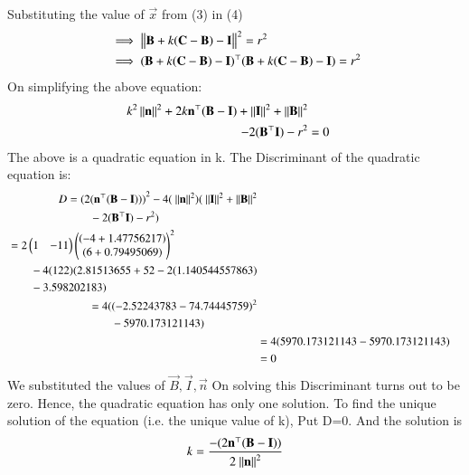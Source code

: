 \documentclass[journal,12pt,twocolumn]{IEEEtran}
\theoremstyle{remark}
\begin{document}
Substituting the value of $ \vec{x} $ from (3) in (4)
\begin{align}
  &\implies\left\lVert \mathbf{B} + k(\mathbf{C}-\mathbf{B})- \mathbf{I} \right\rVert^2 = r^2 \\
  &\implies(\mathbf{B} + k(\mathbf{C}-\mathbf{B})- \mathbf{I})^{\top} (\mathbf{B} + k(\mathbf{C}-\mathbf{B})- \mathbf{I}) = r^2 
\end{align}
On simplifying the above equation:
\begin{align}
\begin{split}
k^2\left\lVert\mathbf{n}\right\rVert^2 +2k{\mathbf{n}^{\top}}({\mathbf{B}-\mathbf{I}})+\left\lVert\mathbf{I}\right\rVert^2 +\left\lVert\mathbf{B}\right\rVert^2\\-2(\mathbf{B}^{\top}\mathbf{I}) - r^2&=0
\end{split}
\end{align}
The above is a quadratic equation in k.
The Discriminant of the quadratic equation is:
\begin{align}
\begin{split}
D &= {(2(\vec{n}^{\top}({\vec{B}-\vec{I}})))}^2-4(\ \norm{\vec{n}}^2)(\ \norm{\vec{I}}^2 +\norm{\vec{B}}^2\\&\qquad-2(\vec{B}^{\top}\vec{I}) - r^2)
\end{split}\nonumber\\
\begin{split}
&={2\myvec{1&-11}\myvec{(-4+1.47756217)\\(6+0.79495069)}}^2 \\&\qquad-4(122)(2.81513655+52-2(1.140544557863)\\&\qquad-3.598202183)
\end{split}\nonumber\\
\begin{split}
&=4({(-2.52243783-74.74445759)}^2\\&\qquad-5970.173121143)
\end{split}\nonumber\\
&=4(5970.173121143-5970.173121143)\nonumber\\
&=0
\end{align}
We substituted the values of $\vec{B},\vec{I},\vec{n}$
On solving this Discriminant turns out to be zero.
Hence, the quadratic equation has only one solution.
To find the unique solution of the equation (i.e. the unique value of k), Put D=0.
And the solution is \begin{align}k=\frac{-(2\mathbf{n}^{\top}({\mathbf{B}-\mathbf{I}}))}{2{\ \left\lVert\mathbf{n}\right\rVert^2}}\end{align}
\end{document}
